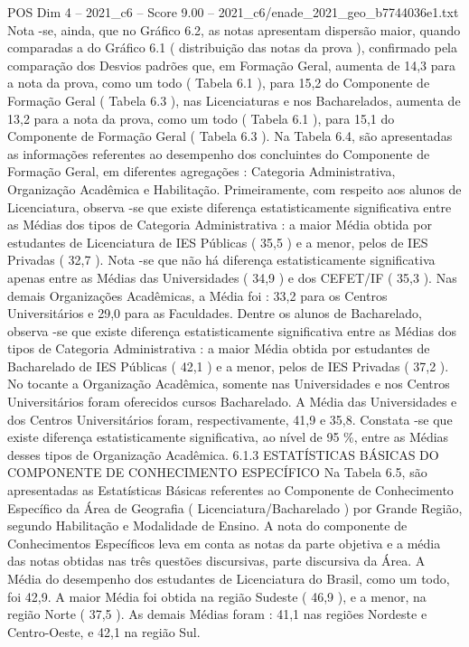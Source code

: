 \begin{textsample}{POS Dim 4 – 2021\_c6 – Score 9.00 – 2021\_c6/enade\_2021\_geo\_b7744036e1.txt}
Nota -se, ainda, que no Gráfico 6.2, as notas apresentam dispersão maior, quando comparadas a do Gráfico 6.1 ( distribuição das notas da prova ), confirmado pela comparação dos Desvios padrões que, em Formação Geral, aumenta de 14,3 para a nota da prova, como um todo ( Tabela 6.1 ), para 15,2 do Componente de Formação Geral ( Tabela 6.3 ), nas Licenciaturas e nos Bacharelados, aumenta de 13,2 para a nota da prova, como um todo ( Tabela 6.1 ), para 15,1 do Componente de Formação Geral ( Tabela 6.3 ).
Na Tabela 6.4, são apresentadas as informações referentes ao desempenho dos concluintes do Componente de Formação Geral, em diferentes agregações : Categoria Administrativa, Organização Acadêmica e Habilitação.
Primeiramente, com respeito aos alunos de Licenciatura, observa -se que existe diferença estatisticamente significativa entre as Médias dos tipos de Categoria Administrativa : a maior Média obtida por estudantes de Licenciatura de IES Públicas ( 35,5 ) e a menor, pelos de IES Privadas ( 32,7 ).
Nota -se que não há diferença estatisticamente significativa apenas entre as Médias das Universidades ( 34,9 ) e dos CEFET/IF ( 35,3 ).
Nas demais Organizações Acadêmicas, a Média foi : 33,2 para os Centros Universitários e 29,0 para as Faculdades.
Dentre os alunos de Bacharelado, observa -se que existe diferença estatisticamente significativa entre as Médias dos tipos de Categoria Administrativa : a maior Média obtida por estudantes de Bacharelado de IES Públicas ( 42,1 ) e a menor, pelos de IES Privadas ( 37,2 ).
No tocante a Organização Acadêmica, somente nas Universidades e nos Centros Universitários foram oferecidos cursos Bacharelado.
A Média das Universidades e dos Centros Universitários foram, respectivamente, 41,9 e 35,8.
Constata -se que existe diferença estatisticamente significativa, ao nível de 95 \%, entre as Médias desses tipos de Organização Acadêmica. 6.1.3 ESTATÍSTICAS BÁSICAS DO COMPONENTE DE CONHECIMENTO ESPECÍFICO Na Tabela 6.5, são apresentadas as Estatísticas Básicas referentes ao Componente de Conhecimento Específico da Área de Geografia ( Licenciatura/Bacharelado ) por Grande Região, segundo Habilitação e Modalidade de Ensino.
A nota do componente de Conhecimentos Específicos leva em conta as notas da parte objetiva e a média das notas obtidas nas três questões discursivas, parte discursiva da Área.
A Média do desempenho dos estudantes de Licenciatura do Brasil, como um todo, foi 42,9.
A maior Média foi obtida na região Sudeste ( 46,9 ), e a menor, na região Norte ( 37,5 ).
As demais Médias foram : 41,1 nas regiões Nordeste e Centro-Oeste, e 42,1 na região Sul.

\end{textsample}
